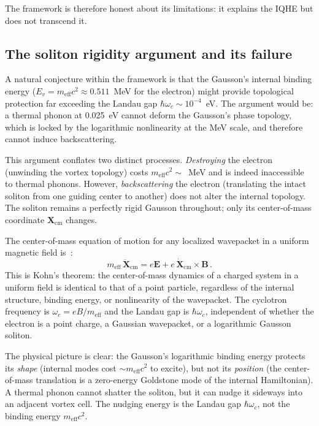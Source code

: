 \documentclass[12pt, a4paper]{article}
\newcommand{\meff}{m_{\mathrm{eff}}}
\begin{document}
The framework is therefore honest about its
limitations: it explains the IQHE but does not
transcend it.

\subsection{The soliton rigidity argument and its
failure}

A natural conjecture within the framework is that
the Gausson's internal binding energy
($E_v = \meff c^2 \approx 0.511$~MeV for the
electron) might provide topological protection
far exceeding the Landau gap
$\hbar\omega_c \sim 10^{-4}$~eV. The argument
would be: a thermal phonon at 0.025~eV cannot
deform the Gausson's phase topology, which is
locked by the logarithmic nonlinearity at the
MeV scale, and therefore cannot induce
backscattering.

This argument conflates two distinct processes.
\emph{Destroying} the electron (unwinding the
vortex topology) costs $\meff c^2 \sim$~MeV and
is indeed inaccessible to thermal phonons.
However, \emph{backscattering} the electron
(translating the intact soliton from one guiding
center to another) does not alter the internal
topology. The soliton remains a perfectly rigid
Gausson throughout; only its center-of-mass
coordinate $\mathbf{X}_{\mathrm{cm}}$ changes.

The center-of-mass equation of motion for any
localized wavepacket in a uniform magnetic field
is~\cite{kohn_1961}:
\begin{equation}
    \meff\,\ddot{\mathbf{X}}_{\mathrm{cm}}
    = e\mathbf{E}
    + e\,\dot{\mathbf{X}}_{\mathrm{cm}}
    \times\mathbf{B}\,.
\label{eq:kohn}
\end{equation}
This is Kohn's theorem: the center-of-mass
dynamics of a charged system in a uniform field
is identical to that of a point particle,
regardless of the internal structure, binding
energy, or nonlinearity of the wavepacket. The
cyclotron frequency is $\omega_c = eB/\meff$ and
the Landau gap is $\hbar\omega_c$, independent of
whether the electron is a point charge, a Gaussian
wavepacket, or a logarithmic Gausson soliton.

The physical picture is clear: the Gausson's
logarithmic binding energy protects its
\emph{shape} (internal modes cost $\sim \meff c^2$
to excite), but not its \emph{position} (the
center-of-mass translation is a zero-energy
Goldstone mode of the internal Hamiltonian). A
thermal phonon cannot shatter the soliton, but it
can nudge it sideways into an adjacent vortex cell.
The nudging energy is the Landau gap
$\hbar\omega_c$, not the binding energy $\meff c^2$.
\end{document}
